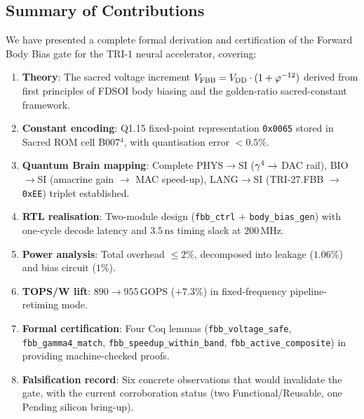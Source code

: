 \subsection{Summary of Contributions}
\label{subsec:conclusion-summary}

We have presented a complete formal derivation and certification of the
Forward Body Bias gate for the TRI-1 neural accelerator, covering:

\begin{enumerate}
  \item \textbf{Theory}: The sacred voltage increment $V_{\mathrm{FBB}} = V_{\mathrm{DD}} \cdot
        (1 + \varphi^{-12}{})$ derived from first principles of FDSOI body
        biasing and the golden-ratio sacred-constant framework.

  \item \textbf{Constant encoding}: Q1.15 fixed-point representation
        \texttt{0x0065} stored in Sacred ROM cell B007$^{4}$, with
        quantisation error $< 0.5\%$.

  \item \textbf{Quantum Brain mapping}: Complete PHYS$\to$SI
        ($\gamma^{4}{} \to$ DAC rail), BIO$\to$SI (amacrine gain
        $\to$ MAC speed-up), LANG$\to$SI (TRI-27.FBB $\to$ \texttt{0xEE})
        triplet established.

  \item \textbf{RTL realisation}: Two-module design
        (\texttt{fbb\_ctrl} + \texttt{body\_bias\_gen}) with
        one-cycle decode latency and $3.5\,\mathrm{ns}$ timing slack at
        $200\,\mathrm{MHz}$.

  \item \textbf{Power analysis}: Total overhead $\leq 2\%$,
        decomposed into leakage ($1.06\%$) and bias circuit ($1\%$).

  \item \textbf{TOPS/W lift}: $890 \to 955\,\mathrm{GOPS}$
        ($+7.3\%$) in fixed-frequency pipeline-retiming mode.

  \item \textbf{Formal certification}: Four Coq lemmas
        (\texttt{fbb\_voltage\_safe}, \texttt{fbb\_gamma4\_match},
        \texttt{fbb\_speedup\_within\_band}, \texttt{fbb\_active\_composite})
        in \coqfile{}~\cite{CoqFBBActive2026} providing machine-checked
        proofs.

  \item \textbf{Falsification record}: Six concrete observations that
        would invalidate the gate, with the current corroboration status
        (two Functional/Reusable, one Pending silicon bring-up).
\end{enumerate}

